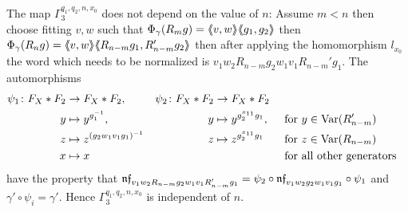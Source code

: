 \documentclass[a4paper,12pt]{article}
\begin{document}
 The map $\Gamma_3^{q_1,q_2,n,x_0}$ does not depend on the value of $n$: Assume $m<n$ then choose  
 fitting $v,w$ such that $\Phi_\gamma(R_mg)=\langle\negthickspace\langle v,w\rangle\negthickspace\rangle\langle\negthickspace\langle g_1,g_2\rangle\negthickspace\rangle$ then $\Phi_\gamma(R_ng)=\langle\negthickspace\langle v,w\rangle\negthickspace\rangle\langle\negthickspace\langle R_{n-m}g_1,R_{n-m}'g_2\rangle\negthickspace\rangle$ 
 then after applying the homomorphism $l_{x_0}$ 
 the word which needs to be normalized is $v_1w_2R_{n-m}g_2w_1v_1R_{n-m}'g_1$. The automorphisms
 \begin{align*}
 \psi_1 \colon F_X*F_2 &\to F_X*F_2, & \psi_2 \colon F_X*F_2 &\to F_X*F_2\\
 y &\mapsto y^{g_1^{-1}}, & y &\mapsto y^{g_2^{x_{11}}g_1}, & &\text{ for }y\in \textup{Var}(R_{n-m}')\\
 z &\mapsto z^{(g_2w_1v_1g_1)^{-1}}& z &\mapsto z^{g_2^{x_{11}}g_1}  & &\text{ for }z\in \textup{Var}(R_{n-m})\\
 x &\mapsto x & & & &\text{ for all other generators}
 \end{align*}
 have the property that $\mathfrak{nf}_{v_1w_2R_{n-m}g_2w_1v_1R_{n-m}'g_1} = \psi_2\circ\mathfrak{nf}_{v_1w_2g_2w_1v_1g_1}\circ \psi_1$ and 
 $\gamma' \circ \psi_i = \gamma'$. Hence $\Gamma_3^{q_1,q_2,n,x_0}$ is independent of $n$.
 
\end{document}
